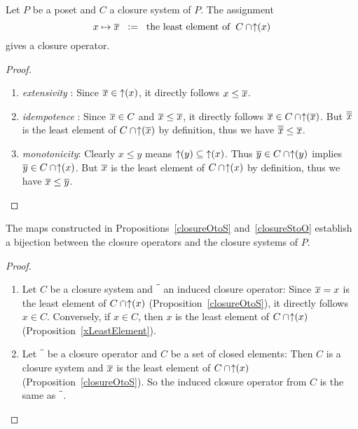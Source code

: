 \begin{proposition} 
\label{closureStoO}
Let $P$ be a poset and  $C$ a closure system of $P$. 
The assignment 
\[ x \mapsto \overline{x} 
\phantom{x} \mathrel{\mathop:}= \phantom{x }\mbox{the least element of}\phantom{x} C\cap\!\mathop{\uparrow}(x) \] 
gives a closure operator. 
\end{proposition}
\begin{proof}
\begin{enumerate}
\item {\em extensivity } : Since $\overline{x} \in \mathop{\uparrow}(x)$, it directly follows $x\leq\overline{x}$.
\item {\em idempotence } : Since $\overline{x} \in C$ and $\overline{x} \leq \overline{x}$, 
it directly follows $\overline{x} \in C\cap\!\mathop{\uparrow}(\overline{x})$. 
But $\overline{\overline{x}}$ is the least element of $C\cap\!\mathop{\uparrow}(\overline{x})$ by definition,
thus we have $\overline{\overline{x}} \leq \overline{x}$. 
\item {\em monotonicity}:
Clearly $x \leq y$ means $\mathop{\uparrow}(y) \subseteq \mathop{\uparrow}(x)$.  
Thus $\overline{y} \in C\cap\!\mathop{\uparrow}(y)$ implies $\overline{y} \in C\cap\!\mathop{\uparrow}(x)$. 
But $\overline{x}$ is the least element of $C\cap\!\mathop{\uparrow}(x)$ by definition,
thus we have $\overline{x} \leq \overline{y}$. 
\end{enumerate}
\end{proof}

\begin{theorem}
The maps constructed 
in Propositions~\ref{closureOtoS} and~\ref{closureStoO}
establish a bijection between the closure operators and the closure systems of $P$.
\end{theorem}
\begin{proof}
\begin{enumerate}
\item  Let $C$ be a closure system and $\closureOP$ an induced closure operator: 
Since $\overline{x} = x$ is the least element of $C\cap\!\mathop{\uparrow}(x)$
(Proposition~\ref{closureOtoS}),
it directly follows $x \in C$. 
Conversely, if $x \in C$,  then $x$ is the least element of $C\cap\!\mathop{\uparrow}(x)$(Proposition~\ref{xLeastElement}).
%
\item  Let $\closureOP$ be a closure operator and $C$ be a set of closed elements: 
Then $C$ is a closure system and 
$\overline{x}$ is the least element of $C\cap\!\mathop{\uparrow}(x)$
(Proposition~\ref{closureOtoS}).
So the induced closure operator  from $C$ is the same as $\closureOP$. 
\end{enumerate}
\end{proof}
%

